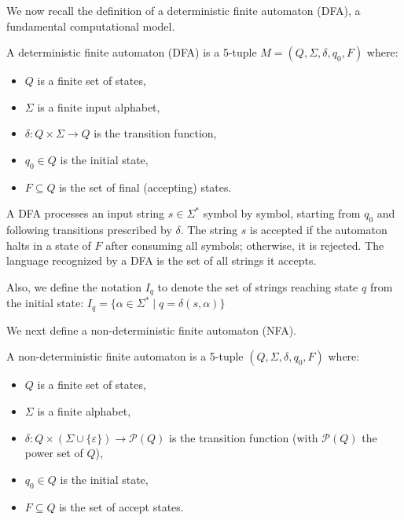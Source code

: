 We now recall the definition of a deterministic finite automaton (DFA), a fundamental computational model.
\begin{definition} \label{def:dfa}
    A deterministic finite automaton (DFA) is a 5-tuple $M = (Q, \Sigma, \delta, q_0, F)$ where:
    \begin{itemize}
        \item $Q$ is a finite set of states,
        \item $\Sigma$ is a finite input alphabet,
        \item $\delta: Q \times \Sigma \rightarrow Q$ is the transition function,
        \item $q_0 \in Q$ is the initial state,
        \item $F \subseteq Q$ is the set of final (accepting) states.
    \end{itemize}
\end{definition}

A DFA processes an input string $s \in \Sigma^*$ symbol by symbol, starting from $q_0$ and following transitions prescribed by $\delta$. The string $s$ is accepted if the automaton halts in a state of $F$ after consuming all symbols; otherwise, it is rejected. The language recognized by a DFA is the set of all strings it accepts.

Also, we define the notation $I_q$ to denote the set of strings reaching state $q$ from the initial state: $I_q = \{\alpha \in \Sigma^* \mid q = \delta(s, \alpha)\}$

We next define a non-deterministic finite automaton (NFA).
\begin{definition} \label{def:nfa}
    A non-deterministic finite automaton is a 5-tuple $(Q, \Sigma, \delta, q_0, F)$ where:
    \begin{itemize}
        \item $Q$ is a finite set of states,
        \item $\Sigma$ is a finite alphabet,
        \item $\delta: Q \times (\Sigma \cup \{\varepsilon\}) \to \mathcal{P}(Q)$ is the transition function (with $\mathcal{P}(Q)$ the power set of $Q$),
        \item $q_0 \in Q$ is the initial state,
        \item $F \subseteq Q$ is the set of accept states.
    \end{itemize}
\end{definition}

